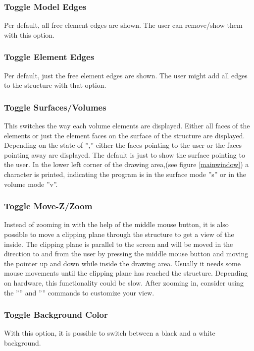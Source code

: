 \documentclass{article}
\begin{document}
\subsubsection{\label{Toggle Model Edges}Toggle Model Edges}
Per default, all free element edges are shown. The user can remove/show them with this option.

\subsubsection{\label{Toggle Element Edges}Toggle Element Edges}
Per default, just the free element edges are shown. The user might add all edges to the structure with that option.

\subsubsection{\label{Toggle Surfaces/Volumes}Toggle Surfaces/Volumes}
This switches the way each volume elements are displayed. Either all faces of the elements or just the element faces on the surface of the structure are displayed. Depending on the state of '','' either the faces pointing to the user or the faces pointing away are displayed. The default is just to show the surface pointing to the user. In the lower left corner of the drawing area,(see figure \ref{mainwindow}) a character is printed, indicating the program is in the surface mode ''s'' or in the volume mode ''v''.

\subsubsection{\label{Toggle Move-Z/Zoom}Toggle Move-Z/Zoom}
Instead of zooming in with the help of the middle mouse button, it is also possible to move a clipping plane through the structure to get a view of the inside. The clipping plane is parallel to the screen and will be moved in the direction to and from the user by pressing the middle mouse button and moving the pointer up and down while inside the drawing area. Usually it needs some mouse movements until the clipping plane has reached the structure. Depending on hardware, this functionality could be slow. After zooming in, consider using the '''' and '''' commands to customize your view.

\subsubsection{\label{Toggle Background Color}Toggle Background Color}
With this option, it is possible to switch between a black and a white background.
\end{document}
